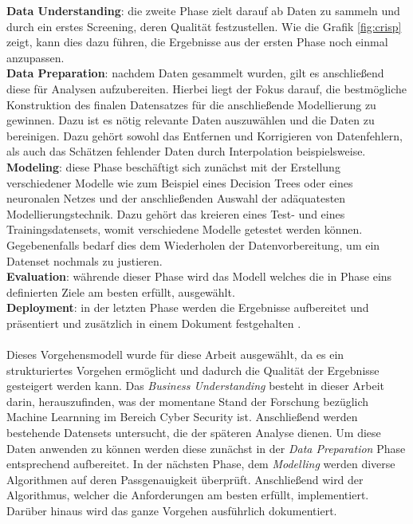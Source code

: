 \documentclass[
    12pt, %
    DIV10,
    ngerman, %
    a4paper, %
    oneside, %
    titlepage, %
    parskip=half, %
    headings=normal, %
    listof=totoc, %
    bibliography=totoc, %
    index=totoc, %
    captions=tableheading, %
    final %
]{scrreprt}
\begin{document}
\textbf{Data Understanding}: die zweite Phase zielt darauf ab Daten zu sammeln und durch ein erstes Screening, deren Qualität festzustellen. Wie die Grafik \ref{fig:crisp} zeigt, kann dies dazu führen, die Ergebnisse aus der ersten Phase noch einmal anzupassen.\\ 
\textbf{Data Preparation}: nachdem Daten gesammelt wurden, gilt es anschließend diese für Analysen aufzubereiten. Hierbei liegt der Fokus darauf, die bestmögliche Konstruktion des finalen Datensatzes für die anschließende Modellierung zu gewinnen. Dazu ist es nötig relevante Daten auszuwählen und die Daten zu bereinigen. Dazu gehört sowohl das Entfernen und Korrigieren von Datenfehlern, als auch das Schätzen fehlender Daten durch Interpolation beispielsweise.\\
\textbf{Modeling}: diese Phase beschäftigt sich zunächst mit der Erstellung verschiedener Modelle wie zum Beispiel eines Decision Trees oder eines neuronalen Netzes und der anschließenden Auswahl der adäquatesten Modellierungstechnik. Dazu gehört das kreieren eines Test- und eines Trainingsdatensets, womit verschiedene Modelle getestet werden können. Gegebenenfalls bedarf dies dem Wiederholen der Datenvorbereitung, um ein Datenset nochmals zu justieren.\\
\textbf{Evaluation}: währende dieser Phase wird das Modell welches die in Phase eins definierten Ziele am besten erfüllt, ausgewählt.\\
\textbf{Deployment}: in der letzten Phase werden die Ergebnisse aufbereitet und präsentiert und zusätzlich in einem Dokument festgehalten \parencite{SmartVisionEurop}.\\\\
Dieses Vorgehensmodell wurde für diese Arbeit ausgewählt, da es ein strukturiertes Vorgehen ermöglicht und dadurch die Qualität der Ergebnisse gesteigert werden kann. Das \emph{Business Understanding} besteht in dieser Arbeit darin, herauszufinden, was der momentane Stand der Forschung bezüglich Machine Learnning im Bereich Cyber Security ist. Anschließend werden bestehende Datensets untersucht, die der späteren Analyse dienen.
Um diese Daten anwenden zu können werden diese zunächst in der \emph{Data Preparation} Phase entsprechend aufbereitet. In der nächsten Phase, dem \emph{Modelling} werden diverse Algorithmen auf deren Passgenauigkeit überprüft. Anschließend wird der Algorithmus, welcher die Anforderungen am besten erfüllt, implementiert. Darüber hinaus wird das ganze Vorgehen ausführlich dokumentiert.
\end{document}
